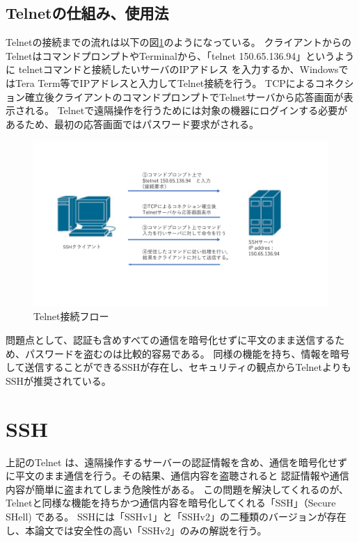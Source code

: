 \documentclass[11pt,a4j,titlepage]{jreport}
\begin{document}
\subsection{Telnetの仕組み、使用法}
Telnetの接続までの流れは以下の図\ref{telnet_flow}のようになっている。
クライアントからのTelnetはコマンドプロンプトやTerminalから、「telnet 150.65.136.94」というように
telnetコマンドと接続したいサーバのIPアドレス
を入力するか、WindowsではTera Term等でIPアドレスと入力してTelnet接続を行う。
TCPによるコネクション確立後クライアントのコマンドプロンプトでTelnetサーバから応答画面が表示される。
Telnetで遠隔操作を行うためには対象の機器にログインする必要があるため、最初の応答画面ではパスワード要求がされる。

\begin{figure}[H]
    \centering
    \includegraphics*[width=1.0\textwidth,page=1]{graphs/network_archtecture.pdf}
    \caption{Telnet接続フロー}
    \label{telnet_flow}
\end{figure}

問題点として、認証も含めすべての通信を暗号化せずに平文のまま送信するため、パスワードを盗むのは比較的容易である。
同様の機能を持ち、情報を暗号して送信することができるSSHが存在し、セキュリティの観点からTelnetよりもSSHが推奨されている。

\section{SSH}
上記のTelnet は、遠隔操作するサーバーの認証情報を含め、通信を暗号化せずに平文のまま通信を行う。その結果、通信内容を盗聴されると
認証情報や通信内容が簡単に盗まれてしまう危険性がある。
この問題を解決してくれるのが、Telnetと同様な機能を持ちかつ通信内容を暗号化してくれる「SSH」（Secure SHell) \cite{RFC4253}である。
SSHには「SSHv1」と「SSHv2」の二種類のバージョンが存在し、本論文では安全性の高い「SSHv2」のみの解説を行う。
\end{document}
